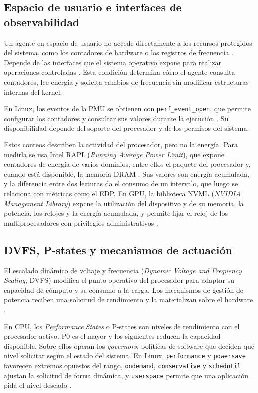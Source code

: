 \subsection{Espacio de usuario e interfaces de observabilidad}
\label{sec:marco-interfaces}

Un agente en espacio de usuario no accede directamente a los recursos protegidos del sistema, como los contadores de hardware o los registros de frecuencia \cite[ch.~2]{Kerrisk2010}. Depende de las interfaces que el sistema operativo expone para realizar operaciones controladas \cite{McCarty2015}. Esta condición determina cómo el agente consulta contadores, lee energía y solicita cambios de frecuencia sin modificar estructuras internas del kernel.

En Linux, los eventos de la PMU se obtienen con \texttt{perf\_event\_open}, que permite configurar los contadores y consultar sus valores durante la ejecución \cite{LinuxPerfEventOpen2026}. Su disponibilidad depende del soporte del procesador y de los permisos del sistema.

Estos conteos describen la actividad del procesador, pero no la energía. Para medirla se usa Intel RAPL (\textit{Running Average Power Limit}), que expone contadores de energía de varios dominios, entre ellos el paquete del procesador y, cuando está disponible, la memoria DRAM \cite{David2010,Thamm2025}. Sus valores son energía acumulada, y la diferencia entre dos lecturas da el consumo de un intervalo, que luego se relaciona con métricas como el EDP. En GPU, la biblioteca NVML (\textit{NVIDIA Management Library}) expone la utilización del dispositivo y de su memoria, la potencia, los relojes y la energía acumulada, y permite fijar el reloj de los multiprocesadores con privilegios administrativos \cite{NVML2026}.

\subsection{DVFS, P-states y mecanismos de actuación}
\label{sec:marco-dvfs}

El escalado dinámico de voltaje y frecuencia (\textit{Dynamic Voltage and Frequency Scaling}, DVFS) modifica el punto operativo del procesador para adaptar su capacidad de cómputo y su consumo a la carga. Los mecanismos de gestión de potencia reciben una solicitud de rendimiento y la materializan sobre el hardware \cite{Hebbar2022}.

En CPU, los \textit{Performance States} o P-states son niveles de rendimiento con el procesador activo. P0 es el mayor y los siguientes reducen la capacidad disponible. Sobre ellos operan los \textit{governors}, políticas de software que deciden qué nivel solicitar según el estado del sistema. En Linux, \texttt{performance} y \texttt{powersave} favorecen extremos opuestos del rango, \texttt{ondemand}, \texttt{conservative} y \texttt{schedutil} ajustan la solicitud de forma dinámica, y \texttt{userspace} permite que una aplicación pida el nivel deseado \cite{Hebbar2022,LinuxCPUFreq2026}.


